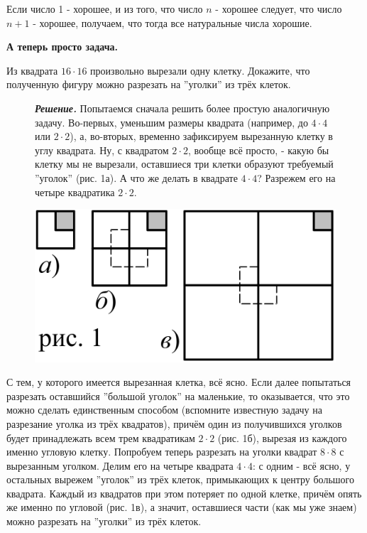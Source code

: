 \begin{samp}
Если число 1 - хорошее, и из того, что число $n$ - хорошее следует, что число $n+1$ - хорошее, получаем, что тогда все натуральные числа хорошие. \smiley
\end{samp}

\begin{center}
    \textbf{А теперь просто задача.}
\end{center}

\begin{thm} \label{6.0 thm1}
Из квадрата $16 \cdot 16$ произвольно вырезали одну клетку. Докажите, что полученную фигуру можно разрезать на ''уголки'' из
трёх клеток.
\end{thm}

{\setlength{\intextsep}{2pt}
\begin{figure}[h]
\begin{minipage}{0.72\linewidth}\setlength{\parindent}{1.5em}
\textbf{\textit{Решение.}} Попытаемся сначала решить более простую аналогичную задачу. 
Во-первых, уменьшим размеры квадрата (например, до $4 \cdot 4$ или $2 \cdot 2$), а, во-вторых, временно зафиксируем вырезанную клетку в углу квадрата. Ну, с квадратом $2 \cdot 2$, вообще всё просто, - какую бы клетку мы не вырезали, оставшиеся три клетки образуют требуемый ''уголок'' (рис. 1а). А что же делать в квадрате $4 \cdot 4$? Разрежем его на четыре квадратика $2 \cdot 2$. 
\end{minipage}
\hfill
\begin{minipage}{0.25\linewidth}
    \includegraphics[scale=0.8]{img/kvadrat1.png}
\end{minipage}
\end{figure}}

С тем, у которого имеется вырезанная клетка, всё ясно. Если далее попытаться разрезать оставшийся ''большой уголок'' на маленькие, то оказывается, что это можно сделать единственным способом (вспомните известную задачу на разрезание уголка из трёх квадратов), причём один из получившихся уголков будет принадлежать всем трем квадратикам $2 \cdot 2$ (рис. 1б), вырезая из каждого именно
угловую клетку. 
Попробуем теперь разрезать на уголки квадрат $8 \cdot 8$ с вырезанным уголком. Делим его на четыре квадрата $4 \cdot 4$: с одним - всё ясно, у остальных вырежем ''уголок'' из трёх клеток, примыкающих к центру большого квадрата. Каждый из квадратов при этом потеряет по одной клетке, причём опять же
именно по угловой (рис. 1в), а значит, оставшиеся части (как мы уже знаем) можно разрезать на ''уголки'' из трёх клеток.


